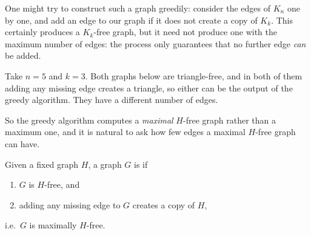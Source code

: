 One might try to construct such a graph greedily: consider the edges of \(K_n\) one by one, and add an edge to our graph if it does not create a copy of \(K_k\). This certainly produces a \(K_k\)-free graph, but it need not produce one with the maximum number of edges: the process only guarantees that no further edge \emph{can} be added.

\begin{eg}\label{eg:c5-k23}
    Take \(n = 5\) and \(k = 3\). Both graphs below are triangle-free, and in both of them adding any missing edge creates a triangle, so either can be the output of the greedy algorithm. They have a different number of edges.
    \begin{center}
    \end{center}
\end{eg}

So the greedy algorithm computes a \emph{maximal} \(H\)-free graph rather than a maximum one, and it is natural to ask how few edges a maximal \(H\)-free graph can have.

\begin{definition}\label{def:saturated}
    Given a fixed graph \(H\), a graph \(G\) is  if
    \begin{enumerate}[(1)]
        \item \(G\) is \(H\)-free, and
        \item adding any missing edge to \(G\) creates a copy of \(H\),
    \end{enumerate}
    i.e.\ \(G\) is maximally \(H\)-free.
\end{definition}

